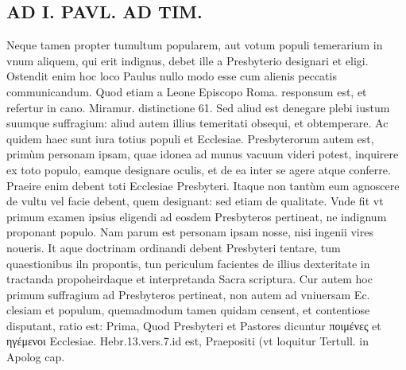 \documentclass{article}
\begin{document}
\begin{pages}
\section*{AD I. PAVL. AD TIM. }
\marginpar{[ p.552 ]}\pstart Neque tamen propter tumultum popularem, aut votum populi temerarium in vnum aliquem, qui erit indignus, debet ille a Presbyterio designari et eligi. Ostendit enim hoc loco Paulus nullo modo esse cum alienis peccatis communicandum. Quod etiam a Leone Episcopo Roma. responsum est, et refertur in cano. Miramur. distinctione 61. Sed aliud est denegare plebi iustum suumque suffragium: aliud autem illius temeritati obsequi, et obtemperare. Ac quidem haec sunt iura totius populi et Ecclesiae.  \pend\pstart Presbyterorum autem est, primùm personam ipsam, quae idonea ad munus vacuum videri potest, inquirere ex toto populo, eamque designare oculis, et de ea inter se agere atque conferre. Praeire enim debent toti Ecclesiae Presbyteri. Itaque non tantùm eum agnoscere de vultu vel facie debent, quem designant: sed etiam de qualitate. Vnde fit vt primum examen ipsius eligendi ad eosdem Presbyteros pertineat, ne indignum proponant populo. Nam parum est personam ipsam nosse, nisi ingenii vires noueris. It aque doctrinam ordinandi debent Presbyteri tentare, tum quaestionibus iln propontis, tun periculum facientes de illius dexteritate in tractanda propoheirdaque et interpretanda Sacra scriptura.  \pend\pstart Cur autem hoc primum suffragium ad Presbyteros pertineat, non autem ad vniuersam Ec. clesiam et populum, quemadmodum tamen quidam censent, et contentiose disputant, ratio est:  \pend\pstart Prima, Quod Presbyteri et Pastores dicuntur ποιμένες et ηγέμενοι Ecclesiae. Hebr.13.vers.7.id est, Praepositi (vt loquitur Tertull. in Apolog cap.  \pend

\end{pages}
\end{document}
